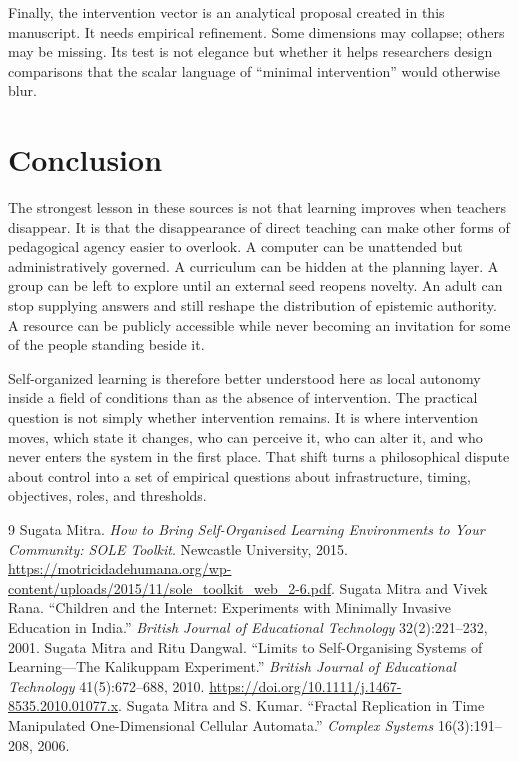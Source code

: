 \documentclass[11pt]{article}
\begin{document}
Finally, the intervention vector is an analytical proposal created in this manuscript. It needs empirical refinement. Some dimensions may collapse; others may be missing. Its test is not elegance but whether it helps researchers design comparisons that the scalar language of ``minimal intervention'' would otherwise blur.

\section{Conclusion}
The strongest lesson in these sources is not that learning improves when teachers disappear. It is that the disappearance of direct teaching can make other forms of pedagogical agency easier to overlook. A computer can be unattended but administratively governed. A curriculum can be hidden at the planning layer. A group can be left to explore until an external seed reopens novelty. An adult can stop supplying answers and still reshape the distribution of epistemic authority. A resource can be publicly accessible while never becoming an invitation for some of the people standing beside it.

Self-organized learning is therefore better understood here as local autonomy inside a field of conditions than as the absence of intervention. The practical question is not simply whether intervention remains. It is where intervention moves, which state it changes, who can perceive it, who can alter it, and who never enters the system in the first place. That shift turns a philosophical dispute about control into a set of empirical questions about infrastructure, timing, objectives, roles, and thresholds.

\begin{thebibliography}{9}
 Sugata Mitra. \emph{How to Bring Self-Organised Learning Environments to Your Community: SOLE Toolkit}. Newcastle University, 2015. \url{https://motricidadehumana.org/wp-content/uploads/2015/11/sole_toolkit_web_2-6.pdf}.
 Sugata Mitra and Vivek Rana. ``Children and the Internet: Experiments with Minimally Invasive Education in India.'' \emph{British Journal of Educational Technology} 32(2):221--232, 2001.
 Sugata Mitra and Ritu Dangwal. ``Limits to Self-Organising Systems of Learning---The Kalikuppam Experiment.'' \emph{British Journal of Educational Technology} 41(5):672--688, 2010. \url{https://doi.org/10.1111/j.1467-8535.2010.01077.x}.
 Sugata Mitra and S. Kumar. ``Fractal Replication in Time Manipulated One-Dimensional Cellular Automata.'' \emph{Complex Systems} 16(3):191--208, 2006.
\end{thebibliography}
\end{document}
